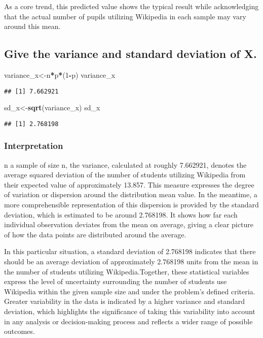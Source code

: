 \documentclass[
]{article}
\newenvironment{Shaded}{\begin{snugshade}}{\end{snugshade}}
\newcommand{\DecValTok}[1]{\textcolor[rgb]{0.00,0.00,0.81}{#1}}
\newcommand{\FunctionTok}[1]{\textcolor[rgb]{0.13,0.29,0.53}{\textbf{#1}}}
\newcommand{\NormalTok}[1]{#1}
\newcommand{\OtherTok}[1]{\textcolor[rgb]{0.56,0.35,0.01}{#1}}
\newcommand{\SpecialCharTok}[1]{\textcolor[rgb]{0.81,0.36,0.00}{\textbf{#1}}}
\begin{document}
As a core trend, this predicted value shows the typical result while
acknowledging that the actual number of pupils utilizing Wikipedia in
each sample may vary around this mean.

\subsection{Give the variance and standard deviation of
X.}\label{give-the-variance-and-standard-deviation-of-x.}

\begin{Shaded}
\begin{Highlighting}[]
\NormalTok{variance\_x}\OtherTok{\textless{}{-}}\NormalTok{n}\SpecialCharTok{*}\NormalTok{p}\SpecialCharTok{*}\NormalTok{(}\DecValTok{1}\SpecialCharTok{{-}}\NormalTok{p)}
\NormalTok{variance\_x}
\end{Highlighting}
\end{Shaded}

\begin{verbatim}
## [1] 7.662921
\end{verbatim}

\begin{Shaded}
\begin{Highlighting}[]
\NormalTok{sd\_x}\OtherTok{\textless{}{-}}\FunctionTok{sqrt}\NormalTok{(variance\_x)}
\NormalTok{sd\_x}
\end{Highlighting}
\end{Shaded}

\begin{verbatim}
## [1] 2.768198
\end{verbatim}

\subsubsection{Interpretation}\label{interpretation-11}

n a sample of size n, the variance, calculated at roughly 7.662921,
denotes the average squared deviation of the number of students
utilizing Wikipedia from their expected value of approximately 13.857.
This measure expresses the degree of variation or dispersion around the
distribution mean value. In the meantime, a more comprehensible
representation of this dispersion is provided by the standard deviation,
which is estimated to be around 2.768198. It shows how far each
individual observation deviates from the mean on average, giving a clear
picture of how the data points are distributed around the average.

In this particular situation, a standard deviation of 2.768198 indicates
that there should be an average deviation of approximately 2.768198
units from the mean in the number of students utilizing
Wikipedia.Together, these statistical variables express the level of
uncertainty surrounding the number of students use Wikipedia within the
given sample size and under the problem's defined criteria. Greater
variability in the data is indicated by a higher variance and standard
deviation, which highlights the significance of taking this variability
into account in any analysis or decision-making process and reflects a
wider range of possible outcomes.
\end{document}
